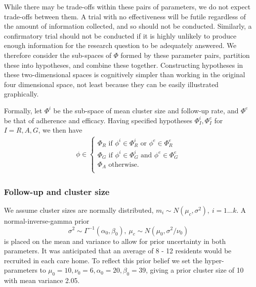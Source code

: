 \documentclass{article} %
\begin{document}
While there may be trade-offs within these pairs of parameters, we do not expect trade-offs between them. A trial with no effectiveness will be futile regardless of the amount of information collected, and so should not be conducted. Similarly, a confirmatory trial should not be conducted if it is highly unlikely to produce enough information for the research question to be adequately answered. We therefore consider the sub-spaces of $\Phi$ formed by these parameter pairs, partition these into hypotheses, and combine these together. Constructing hypotheses in these two-dimensional spaces is cognitively simpler than working in the original four dimensional space, not least because they can be easily illustrated graphically.

Formally, let $\Phi^i$ be the sub-space of mean cluster size and follow-up rate, and $\Phi^e$ be that of adherence and efficacy. Having specified hypotheses $\Phi^i_I, \Phi^e_I$ for $I = R,A,G$, we then have 
\begin{align}\label{eqn:comb_hyp}
\phi \in \begin{cases}
               \Phi_R \text{ if }  \phi^i \in \Phi^i_R \text{ or } \phi^e \in \Phi^e_R \\
               \Phi_G \text{ if }  \phi^i \in \Phi^i_G \text{ and } \phi^e \in \Phi^e_G \\
               \Phi_A \text{ otherwise}. \\
            \end{cases}
\end{align}

\subsubsection{Follow-up and cluster size}

We assume cluster sizes are normally distributed, $m_{i} \sim N(\mu_{c}, \sigma^{2}),~ i = 1 \ldots k$. A normal-inverse-gamma prior 
\begin{equation}
\sigma^{2} \sim \Gamma^{-1} (\alpha_{0}, \beta_{0}), ~ \mu_{c} \sim N(\mu_{0}, \sigma^{2}/\nu_{0})
\end{equation}
is placed on the mean and variance to allow for prior uncertainty in both parameters. It was anticipated that an average of 8 - 12 residents would be recruited in each care home. To reflect this prior belief we set the hyper-parameters to $\mu_{0} = 10, \nu_{0} = 6, \alpha_{0} = 20, \beta_{0} = 39$, giving a prior cluster size of 10 with mean variance 2.05.
\end{document}
